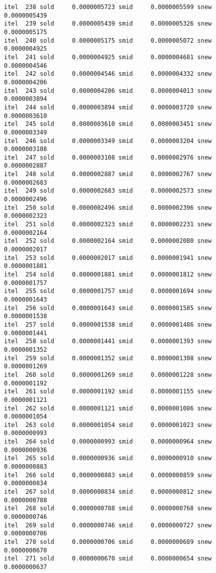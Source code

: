 \documentclass[
  12pt,
  letterpaper,
  DIV=11,
  numbers=noendperiod]{scrartcl}
\begin{document}
\begin{verbatim}
itel  238 sold     0.0000005723 smid     0.0000005599 snew     0.0000005439 
itel  239 sold     0.0000005439 smid     0.0000005326 snew     0.0000005175 
itel  240 sold     0.0000005175 smid     0.0000005072 snew     0.0000004925 
itel  241 sold     0.0000004925 smid     0.0000004681 snew     0.0000004546 
itel  242 sold     0.0000004546 smid     0.0000004332 snew     0.0000004206 
itel  243 sold     0.0000004206 smid     0.0000004013 snew     0.0000003894 
itel  244 sold     0.0000003894 smid     0.0000003720 snew     0.0000003610 
itel  245 sold     0.0000003610 smid     0.0000003451 snew     0.0000003349 
itel  246 sold     0.0000003349 smid     0.0000003204 snew     0.0000003108 
itel  247 sold     0.0000003108 smid     0.0000002976 snew     0.0000002887 
itel  248 sold     0.0000002887 smid     0.0000002767 snew     0.0000002683 
itel  249 sold     0.0000002683 smid     0.0000002573 snew     0.0000002496 
itel  250 sold     0.0000002496 smid     0.0000002396 snew     0.0000002323 
itel  251 sold     0.0000002323 smid     0.0000002231 snew     0.0000002164 
itel  252 sold     0.0000002164 smid     0.0000002080 snew     0.0000002017 
itel  253 sold     0.0000002017 smid     0.0000001941 snew     0.0000001881 
itel  254 sold     0.0000001881 smid     0.0000001812 snew     0.0000001757 
itel  255 sold     0.0000001757 smid     0.0000001694 snew     0.0000001643 
itel  256 sold     0.0000001643 smid     0.0000001585 snew     0.0000001538 
itel  257 sold     0.0000001538 smid     0.0000001486 snew     0.0000001441 
itel  258 sold     0.0000001441 smid     0.0000001393 snew     0.0000001352 
itel  259 sold     0.0000001352 smid     0.0000001308 snew     0.0000001269 
itel  260 sold     0.0000001269 smid     0.0000001228 snew     0.0000001192 
itel  261 sold     0.0000001192 smid     0.0000001155 snew     0.0000001121 
itel  262 sold     0.0000001121 smid     0.0000001086 snew     0.0000001054 
itel  263 sold     0.0000001054 smid     0.0000001023 snew     0.0000000993 
itel  264 sold     0.0000000993 smid     0.0000000964 snew     0.0000000936 
itel  265 sold     0.0000000936 smid     0.0000000910 snew     0.0000000883 
itel  266 sold     0.0000000883 smid     0.0000000859 snew     0.0000000834 
itel  267 sold     0.0000000834 smid     0.0000000812 snew     0.0000000788 
itel  268 sold     0.0000000788 smid     0.0000000768 snew     0.0000000746 
itel  269 sold     0.0000000746 smid     0.0000000727 snew     0.0000000706 
itel  270 sold     0.0000000706 smid     0.0000000689 snew     0.0000000670 
itel  271 sold     0.0000000670 smid     0.0000000654 snew     0.0000000637 

\end{verbatim}
\end{document}
